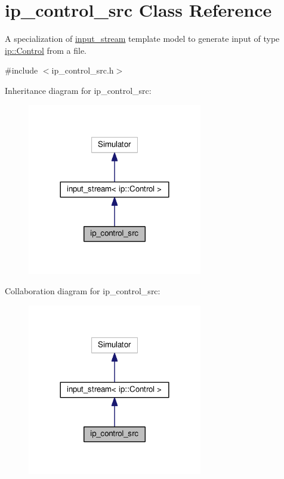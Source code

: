 \hypertarget{classip__control__src}{}\section{ip\+\_\+control\+\_\+src Class Reference}
\label{classip__control__src}


A specialization of \hyperlink{classinput__stream}{input\+\_\+stream} template model to generate input of type \hyperlink{structip_1_1Control}{ip\+::\+Control} from a file.  




{\ttfamily \#include $<$ip\+\_\+control\+\_\+src.\+h$>$}



Inheritance diagram for ip\+\_\+control\+\_\+src\+:\nopagebreak
\begin{figure}[H]
\begin{center}
\leavevmode
\includegraphics[width=216pt]{classip__control__src__inherit__graph}
\end{center}
\end{figure}


Collaboration diagram for ip\+\_\+control\+\_\+src\+:\nopagebreak
\begin{figure}[H]
\begin{center}
\leavevmode
\includegraphics[width=216pt]{classip__control__src__coll__graph}
\end{center}
\end{figure}
